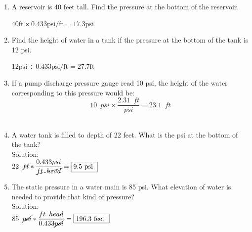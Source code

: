\documentclass{article}
\begin{document}
\begin{enumerate}

\item A reservoir is 40 feet tall. Find the pressure at the bottom of the reservoir.

$40 \mathrm{ft} \times 0.433 \mathrm{psi} / \mathrm{ft}=17.3 \mathrm{psi}$

\vspace{0.4cm}

\item Find the height of water in a tank if the pressure at the bottom of the tank is 12 psi.

$12 \mathrm{psi} \div 0.433 \mathrm{psi} / \mathrm{ft}=27.7 \mathrm{ft}$

\vspace{0.4cm}

\item If a pump discharge pressure gauge read 10 psi, the height of the water corresponding to this pressure would be:
$$10 \enspace psi \times \dfrac{2.31 \enspace ft}{psi}=23.1 \enspace ft$$\\
\vspace{0.4cm}
\item A water tank is filled to depth of 22 feet. What is the psi at the bottom of the tank?\\
 \vspace{0.2cm}
Solution:\\ 
 \vspace{0.2cm}
$
22 \enspace \cancel{ft}*\dfrac{0.433psi}{\cancel{ft \enspace head}}=\boxed{9.5 \text { psi }}
$
  \vspace{0.2cm}
\item The static pressure in a water main is 85 psi. What elevation of water is needed to provide that kind of pressure?\\
 \vspace{0.2cm}
Solution:\\ 
 \vspace{0.2cm}
$
85 \enspace \cancel{psi}*\dfrac{ft \enspace head}{0.433\cancel{psi}}=\boxed{196.3 \text { feet }}
$
 
 \vspace{0.2cm}


\end{enumerate}
\end{document}
